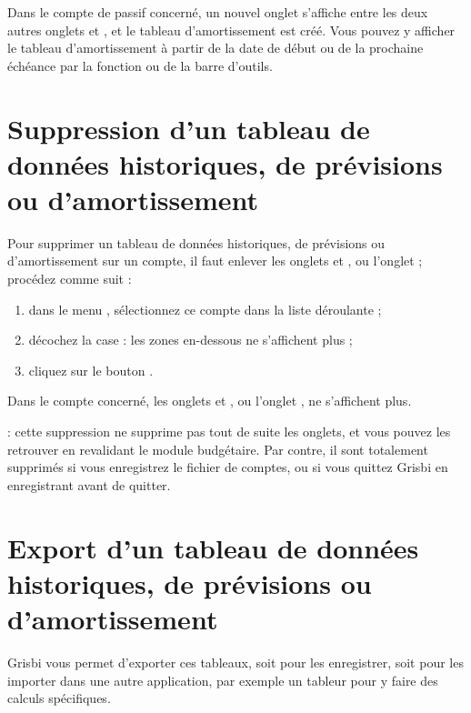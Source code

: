 Dans le compte de passif concerné, un nouvel onglet  s'affiche entre les deux autres onglets  et , et le tableau d'amortissement est créé. Vous pouvez y afficher le tableau d'amortissement à partir de la date de début ou de la prochaine échéance par la fonction  ou  de la barre d'outils.


\section{Suppression d'un tableau de données historiques, de prévisions ou d'amortissement\label{budget-remove}}


Pour supprimer un tableau de données historiques, de prévisions ou d'amortissement sur un compte, il faut enlever les onglets  et , ou l'onglet  ; procédez comme suit :


\begin{enumerate}
	\item dans le menu , sélectionnez ce compte dans la liste déroulante ;
	\item décochez la case  : les zones en-dessous ne s'affichent plus ;
	\item cliquez sur le bouton .	
\end{enumerate}

Dans le compte concerné, les onglets  et , ou l'onglet , ne s'affichent plus.

 : cette suppression ne supprime pas tout de suite les onglets, et vous pouvez les retrouver en revalidant le module budgétaire. Par contre, il sont totalement supprimés si vous enregistrez le fichier de comptes, ou si vous quittez Grisbi en enregistrant avant de quitter.


\section{Export d'un tableau de données historiques, de prévisions ou d'amortissement\label{budget-export}}


Grisbi vous permet d'exporter ces tableaux, soit pour les enregistrer, soit pour les importer dans une autre application, par exemple un tableur pour y faire des calculs spécifiques. 

